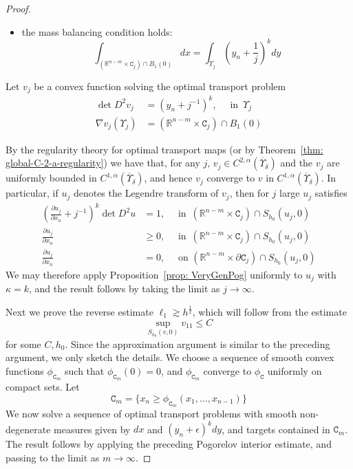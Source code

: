 \documentclass[12pt,reqno]{amsart}
\newcommand{\del}{\partial}
\numberwithin{equation}{section}
\begin{document}
\begin{proof}
\begin{itemize}
\item the mass balancing condition holds:
\[
\int_{(\mathbb{R}^{n-m}\times \mathtt{C}_j)\cap B_1(0)} dx = \int_{\Upsilon_j} (y_n+\frac{1}{j})^{k} dy
\]
\end{itemize}
Let $v_j$ be a convex function solving the optimal transport problem
\begin{equation}\label{eq: PogOTEqnApprox}
    \begin{aligned}
    \det D^2v_j&=(y_n+j^{-1})^{k}, \quad \text{ in  }\, \Upsilon_j \\
    \nabla v_j(\Upsilon_j) &= (\mathbb{R}^{n-m}\times \mathtt{C}_j)\cap B_1(0)
    \end{aligned}
    \end{equation}

By the regularity theory for optimal transport maps \cite{Caffarelli, Caffarelli2, Chen-Liu-Wang, Jhaveri-Savin} (or by Theorem~\ref{thm: global-C-2-a-regularity}) we have that, for any $j$, $v_j \in C^{2,\alpha}(\overline{\Upsilon}_{\delta})$ and the $v_j$ are uniformly bounded in $C^{1,\alpha}(\overline{\Upsilon}_{\delta})$, and hence $v_j$ converge to $v$ in $C^{1,\alpha}(\overline{\Upsilon}_{\delta})$.  In particular, if $u_j$ denotes the Legendre transform of $v_j$, then for $j$ large $u_j$ satisfies 
\begin{equation}\label{eq: PogOTEqn}
    \begin{aligned}
    (\frac{\del u_j}{\del x_n}+j^{-1})^{k}\det D^2u&=1, \quad \text{ in  }\, (\mathbb{R}^{n-m} \times \mathtt C_j)\cap S_{h_0}(u_j,0) \\
    \frac{\del u_{j}}{\del x_n} &\geq 0, \quad \text{ in  }\, (\mathbb{R}^{n-m} \times \mathtt C_j)\cap S_{h_0}(u_j,0)\\
    \frac{\del u_{j}}{\del x_n}&=0,\quad  \text{ on } (\mathbb{R}^{n-m} \times \del \mathtt C_j) \cap S_{h_0}(u_j,0)
    \end{aligned}
    \end{equation}
We may therefore apply Proposition~\ref{prop: VeryGenPog} uniformly to $u_j$ with $\kappa =k$, and the result follows by taking the limit as $j\rightarrow \infty$.

Next we prove the reverse estimate $\ell_1 \gtrsim h^{\frac{1}{2}}$, which will follow from the estimate 
\[
\sup_{S_{h_0}(v,0)} v_{11} \leq C
\]
for some $C, h_0$. Since the approximation argument is similar to the preceding argument, we only sketch the details. 
We choose a sequence of smooth convex functions $\phi_{\mathtt{C}_m}$ such that $ \phi_{\mathtt{C}_m}(0)= 0$, and $\phi_{\mathtt{C}_m}$ converge to $\phi_{\mathtt{C}}$ uniformly on compact sets.  Let
    \[
    \mathtt{C}_m = \{ x_n \geq \phi_{\mathtt{C}_m}(x_1,\ldots, x_{n-1})\}
    \]
    We now solve a sequence of optimal transport problems with smooth non-degenerate measures given by $dx$ and $(y_n+\epsilon)^kdy$, and targets contained in $\mathtt{C}_m$.  The result follows by applying the preceding Pogorelov interior estimate, and passing to the limit as $m\rightarrow \infty$.  





\end{proof}
\end{document}
